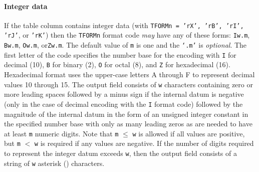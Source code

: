 \documentclass[11pt,makeidx]{book}     %
\begin{document}
 \paragraph{Integer data} If the table column contains integer data
 (with {\tt TFORMn = 'rX', 'rB', 'rI', 'rJ'}, or {\tt 'rK'})
 then the {\tt TFORMn} 
 format code {\em may} have any of these forms: {\tt I}{\tt w.m\/}, 
 {\tt B}{\tt w.m\/}, {\tt O}{\tt w.m\/}, or{\tt Z}{\tt w.m\/}.  The
 default value of {\tt m} is one and the {\tt `.m'} is {\em optional}.  The
 first letter of the code specifies the number base for the encoding
 with {\tt I} for decimal (10), {\tt B} for binary (2), {\tt O} for
 octal (8), and {\tt Z} for hexadecimal (16).  Hexadecimal format uses
 the upper-case letters A through F to represent decimal values 10
 through 15.  The output field consists of {\tt w} characters containing
 zero or more leading spaces followed by a minus sign if the internal datum
 is negative (only in the case of decimal encoding with the {\tt I} format code)
 followed by the magnitude of the internal datum in the form
 of an unsigned integer constant in the specified number base with only
 as many leading zeros as are needed to have at least {\tt m} numeric
 digits.  Note that {\tt m} $\leq$ {\tt w} is allowed if all values are 
 positive,
 but {\tt m} $<$ {\tt w} is required if any values are negative.  
 If the number of
 digits required to represent the integer datum exceeds {\tt w}, then the
 output field consists of a string of {\tt w} asterisk ({\tt *})
 characters.
\end{document}
